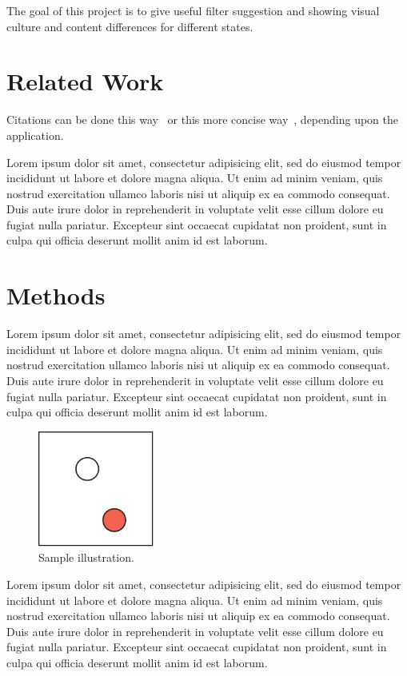 \documentclass[conference]{acmsiggraph}
\begin{document}
The goal of this project is to give useful filter suggestion and showing visual culture and content differences for different states. 

\section{Related Work}

Citations can be done this way~\cite{Jobs95} or this more concise 
way~, depending upon the application.

Lorem ipsum dolor sit amet, consectetur adipisicing elit, sed do
eiusmod tempor incididunt ut labore et dolore magna aliqua. Ut enim ad
minim veniam, quis nostrud exercitation ullamco laboris nisi ut
aliquip ex ea commodo consequat. Duis aute irure dolor in
reprehenderit in voluptate velit esse cillum dolore eu fugiat nulla
pariatur. Excepteur sint occaecat cupidatat non proident, sunt in
culpa qui officia deserunt mollit anim id est laborum.

\section{Methods}

Lorem ipsum dolor sit amet, consectetur adipisicing elit, sed do
eiusmod tempor incididunt ut labore et dolore magna aliqua. Ut enim ad
minim veniam, quis nostrud exercitation ullamco laboris nisi ut
aliquip ex ea commodo consequat. Duis aute irure dolor in
reprehenderit in voluptate velit esse cillum dolore eu fugiat nulla
pariatur. Excepteur sint occaecat cupidatat non proident, sunt in
culpa qui officia deserunt mollit anim id est laborum.

\begin{figure}[ht]
  \centering
  \includegraphics[width=1.5in]{images/samplefigure}
  \caption{Sample illustration.}
\end{figure}
Lorem ipsum dolor sit amet, consectetur adipisicing elit, sed do
eiusmod tempor incididunt ut labore et dolore magna aliqua. Ut enim ad
minim veniam, quis nostrud exercitation ullamco laboris nisi ut
aliquip ex ea commodo consequat. Duis aute irure dolor in
reprehenderit in voluptate velit esse cillum dolore eu fugiat nulla
pariatur. Excepteur sint occaecat cupidatat non proident, sunt in
culpa qui officia deserunt mollit anim id est laborum.
\end{document}
